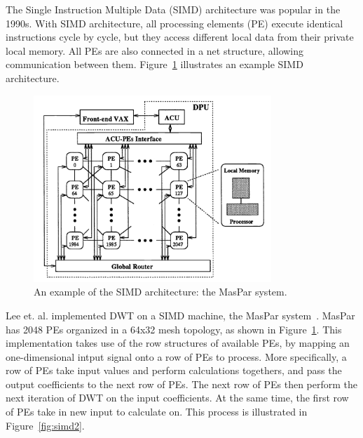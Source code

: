 The Single Instruction Multiple Data (SIMD) architecture was popular in the
1990s.
%
With SIMD architecture, all processing elements (PE) execute identical instructions
cycle by cycle, but they access different local data from their private 
local memory.
%
All PEs are also connected in a net structure, allowing
communication between them.
%
Figure~\ref{fig:simd1} illustrates an example SIMD architecture.

\begin{figure}
    \centering
    \includegraphics[width=0.8\textwidth]{fig/simd.png}
    \caption{An example of the SIMD architecture: the MasPar system.}
    \label{fig:simd1}
\end{figure}


Lee et. al. implemented DWT on a SIMD machine, the MasPar
system~\cite{lee1994parallel}.
%
MasPar has 2048 PEs organized in a 64x32
mesh topology, as shown in Figure~\ref{fig:simd1}.
%
This implementation takes use of the row structures of available PEs,
by mapping an one-dimensional intput signal onto a row of PEs to process.
%
More specifically, a row of PEs take input values and perform calculations 
togethers, and pass the output coefficients to the next row of PEs.
%
The next row of PEs then perform the next iteration of DWT on the input
coefficients.
%
At the same time, the first row of PEs take in new input to calculate on.
%
This process is illustrated in Figure~\ref{fig:simd2}.


